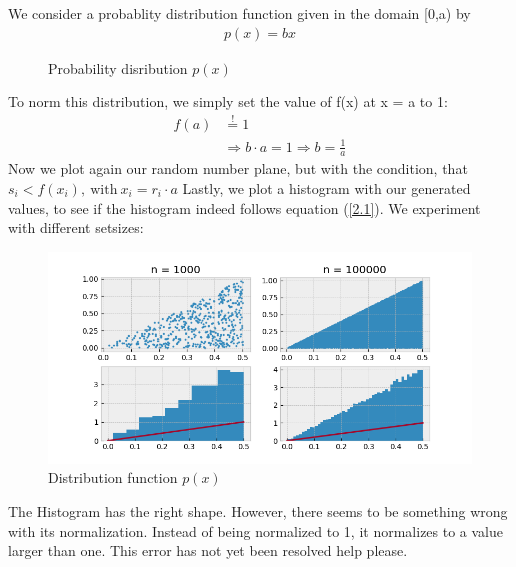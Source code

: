 \documentclass{article}
\begin{document}
We consider a probablity distribution function given in the domain [0,a) by
\begin{align}
    p(x) = bx \label{2.1}
\end{align}
\begin{figure}[H]
    \centering
    \caption{Probability disribution $p(x)$}
\end{figure}
To norm this distribution, we simply set the value of f(x) at x = a to 1:
\begin{align} \nonumber
    f(a) &\stackrel{!}{=} 1 \\
    &\Rightarrow b \cdot a = 1 \Rightarrow b = \frac{1}{a}
\end{align}
Now we plot again our random number plane, but with the condition, that
\(s_i < f(x_i), \ \text{with} \ x_i = r_i \cdot a\) 
Lastly, we plot a histogram with our generated values, to see if the histogram
indeed follows equation (\ref{2.1}). We experiment with different setsizes:
\begin{figure}[H]
    \centering
    \includegraphics[width=12cm]{Fig2-1.png}
    \caption{Distribution function \( p(x) \)}
\end{figure}
The Histogram has the right shape. However, there seems to be something wrong 
with its normalization. Instead of being normalized to 1, it normalizes to
a value larger than one. \color{red!90!black} This error has not yet been
resolved help please. \color{black}
\end{document}
